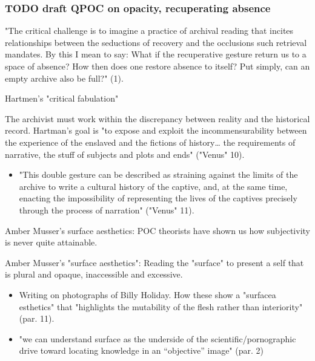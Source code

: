 \documentclass[11pt]{article}
\begin{document}
\subsubsection{{\bfseries\sffamily TODO} draft QPOC on opacity, recuperating absence}
\label{sec:org361c546}

"The critical challenge is to imagine a practice of archival reading
that incites relationships between the seductions of recovery and the
occlusions such retrieval mandates. By this I mean to say: What if the
recuperative gesture return us to a space of absence? How then does
one restore absence to itself? Put simply, can an empty archive also
be full?" (1). 

Hartmen's "critical fabulation"

The archivist must work within the discrepancy between reality and the
historical record. Hartman's goal is "to expose and exploit the
incommensurability between the experience of the enslaved and the
fictions of history\ldots{} the requirements of narrative, the stuff of
subjects and plots and ends" ("Venus" 10).
\begin{itemize}
\item "This double gesture can be described as straining against the
limits of the archive to write a cultural history of the captive,
and, at the same time, enacting the impossibility of representing
the lives of the captives precisely through the process of
narration" ("Venus" 11).
\end{itemize}

Amber Musser's surface aesthetics: POC theorists have shown us how
subjectivity is never quite attainable.

Amber Musser's "surface aesthetics": Reading the "surface" to present
a self that is plural and opaque, inaccessible and excessive.
\begin{itemize}
\item Writing on photographs of Billy Holiday. How these show a
"surfacea esthetics" that "highlights the mutability of the flesh
rather than interiority" (par. 11).
\item "we can understand surface as the underside of the
scientific/pornographic drive toward locating knowledge in an
“objective” image" (par. 2)
\end{itemize}
\end{document}
